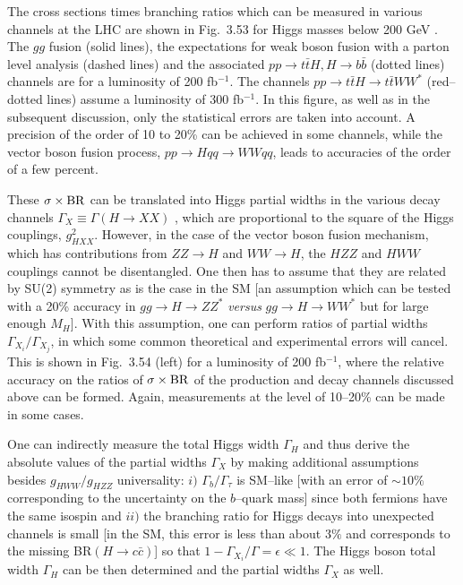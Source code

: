 The cross sections times branching ratios which can be measured in various
channels at the LHC are shown in Fig.~3.53 for Higgs masses below 200 GeV
\cite{Zepp-meas}. The $gg$ fusion (solid lines), the expectations for weak
boson fusion with a parton level analysis (dashed lines) and the associated $pp
\to t\bar{t}H , H\to b\bar{b}$ (dotted lines) channels are for a luminosity of
200 fb$^{-1}$. The channels $pp \to t\bar{t}H \to t\bar t WW^*$ (red--dotted
lines) assume a luminosity of 300 fb$^{-1}$. In this figure, as well as in the
subsequent discussion, only the statistical errors are taken into account. A
precision of the order of 10 to 20\% can be achieved in some channels, while
the vector boson fusion process, $pp \to H qq \to W W qq$, leads to accuracies
of the order of a few percent. \s 

These $\sigma \times  {\rm BR}$ can be translated into Higgs partial widths in
the various decay channels $\Gamma_X \equiv \Gamma( H\to XX)$ \cite{Duhrssen},
which are proportional to the square of the Higgs couplings, $g_{HXX}^2$.
However, in the case of the vector boson fusion mechanism,  which has
contributions from $ZZ \to H$ and $WW \to H$, the $HZZ$ and $HWW$ couplings
cannot be disentangled.  One then has to assume that they are related by SU(2)
symmetry as is the case in the SM [an assumption which can be tested with a
20\% accuracy in $gg\to H \to ZZ^*$ {\it versus} $gg \to H\to WW^*$ but for
large enough $M_H$]. With this assumption, one can perform ratios of partial
widths $\Gamma_{X_i} /\Gamma_{X_j}$, in which some common theoretical and
experimental errors will cancel. This is shown in Fig.~3.54 (left) for a
luminosity of 200  fb$^{-1}$, where the relative accuracy on the ratios of
$\sigma \times  {\rm BR}$ of the production and decay channels discussed above
can be formed. Again, measurements at the level of 10--20\% can be made in
some cases. \s

One can indirectly measure the total Higgs width $\Gamma_H$ and thus derive the
absolute values of the partial widths $\Gamma_X$ by making additional
assumptions besides $g_{HWW}/g_{HZZ}$ universality: $i)$ $\Gamma_b/\Gamma_
\tau$ is SM--like [with an error of $\sim 10\%$ corresponding to the
uncertainty on the $b$--quark mass] since both fermions have the same isospin
and $ii)$ the branching ratio for Higgs decays into unexpected channels is
small [in the SM, this error is less than about $3\%$ and corresponds to the
missing BR$(H \to c\bar c)$] so that $1-\Gamma_{X_i}/\Gamma = \epsilon \ll 1$. 
The Higgs boson total width $\Gamma_H$ can be then determined and the partial
widths $\Gamma_X$ as well. \s

